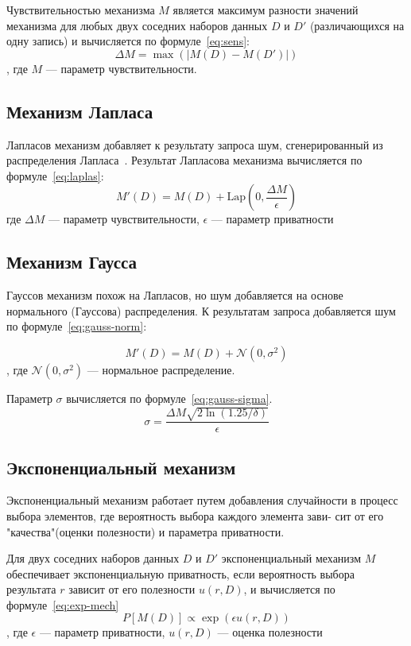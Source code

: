 Чувствительностью механизма $M$ является максимум разности значений механизма для любых двух соседних наборов данных $D$ и $D'$ (различающихся на одну запись) и вычисляется по формуле~\ref{eq:sens}:
\begin{equation}\label{eq:sens}
	\Delta M  = \max(|M(D) - M(D')|)
\end{equation}
, где $M$ --- параметр чувствительности.

\subsection{Механизм Лапласа}
Лапласов механизм добавляет к результату запроса шум, сгенерированный из распределения Лапласа~\cite{main}.
Результат Лапласова механизма вычисляется по формуле~\ref{eq:laplas}:
\begin{equation}\label{eq:laplas}
	M'(D) = M(D) + \text{Lap}(0, \frac{\Delta M}{\epsilon})
\end{equation}
где $\Delta M$ --- параметр чувствительности, $\epsilon$ --- параметр приватности

\subsection{Механизм Гаусса} 
Гауссов механизм похож на Лапласов, но шум добавляется на основе нормального (Гауссова) распределения.
К результатам запроса добавляется шум по формуле~\ref{eq:gauss-norm}:

\begin{equation}\label{eq:gauss-norm}
	M'(D) = M(D) + \mathcal{N}(0, \sigma^2)
\end{equation}
, где $\mathcal{N}(0, \sigma^2)$ --- нормальное распределение.

Параметр $\sigma$ вычисляется по формуле~\ref{eq:gauss-sigma}.
\begin{equation}\label{eq:gauss-sigma}
	\sigma = \frac{\Delta M \sqrt{2 \ln(1.25/\delta)}}{\epsilon}
\end{equation}

\subsection{Экспоненциальный механизм}
Экспоненциальный механизм работает путем добавления случайности в
процесс выбора элементов, где вероятность выбора каждого элемента зави-
сит от его "качества"(оценки полезности) и параметра приватности.

Для двух соседних наборов данных $D$ и $D'$  экспоненциальный механизм $M$ обеспечивает экспоненциальную приватность, если вероятность выбора результата $r$ зависит от его полезности $u(r, D)$, и вычисляется по формуле~\ref{eq:exp-mech}
\begin{equation}\label{eq:exp-mech}
	P[M(D)] \propto \exp(\epsilon  u(r, D))
\end{equation}
, где $\epsilon$ --- параметр приватности, $u(r, D)$ --- оценка полезности 

